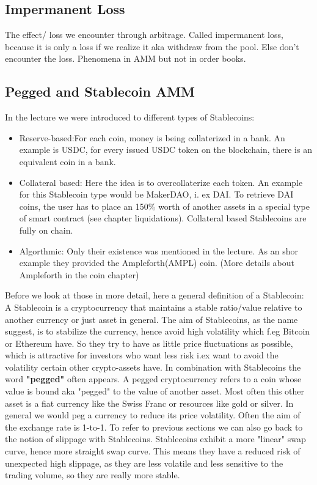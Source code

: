 \documentclass{article}
\begin{document}
\subsection{Impermanent Loss} %
The effect/ loss we encounter through arbitrage. Called impermanent loss, because it is only a loss if we realize it aka withdraw from the pool. Else don't encounter the loss. Phenomena in AMM but not in order books.


\subsection{Pegged and Stablecoin AMM} 
In the lecture we were introduced to different types of Stablecoins: 
\begin{itemize}
    \item {Reserve-based}:For each coin, money is being collaterized in a bank. An example is USDC, for every issued USDC token on the blockchain, there is an equivalent coin in a bank. 
    \item {Collateral based}: Here the idea is to overcollaterize each token. An example for this Stablecoin type would be MakerDAO, i. ex DAI. To retrieve DAI coins, the user has to place an 150\% worth of another assets in a special type of smart contract (see chapter liquidations). Collateral based Stablecoins are fully on chain.
    \item {Algorthmic}: Only their existence was mentioned in the lecture. As an shor example they provided the Ampleforth(AMPL) coin. (More details about Ampleforth in the coin chapter)
\end{itemize}Before we look at those in more detail, here a general definition of a Stablecoin: A Stablecoin is a cryptocurrency that maintains a stable ratio/value relative to another currency or just asset in general. The aim of Stablecoins, as the name suggest, is to stabilize the currency, hence avoid high volatility which f.eg Bitcoin or Ethereum have. So they try to have as little price fluctuations as possible, which is attractive for investors who want less risk i.ex want to avoid the volatility certain other crypto-assets have.
In combination with Stablecoins the word  \textbf{"pegged" }often appears. A pegged cryptocurrency refers to a coin whose value is bound aka "pegged" to the value of another asset. Most often this other asset is a fiat currency like the Swiss Franc or resources like gold or silver. In general we would peg a currency to reduce its price volatility. Often the aim of the exchange rate is 1-to-1. To refer to previous sections we can also go back to the notion of slippage with Stablecoins. Stablecoins exhibit a more "linear" swap curve, hence more straight swap curve. This means they have a reduced risk of unexpected high slippage, as they are less volatile and less sensitive to the trading volume, so they are really more stable.\\
\end{document}
